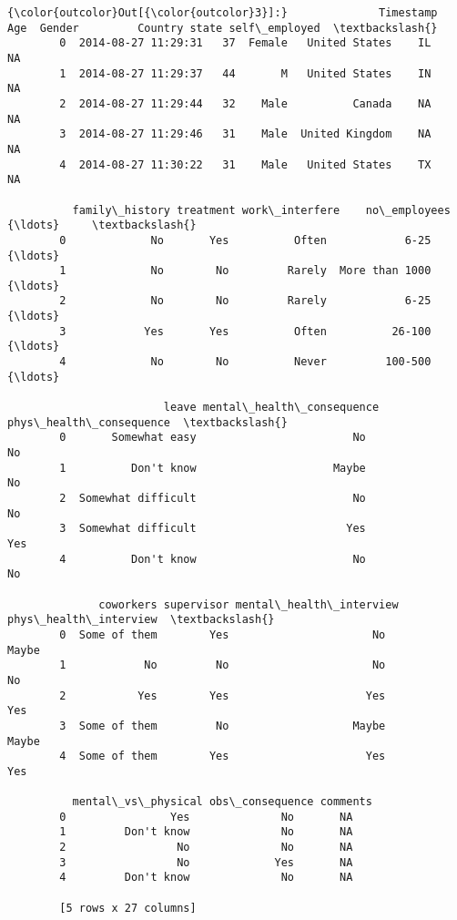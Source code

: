 \documentclass[11pt]{article}
\begin{document}
\begin{Verbatim}[commandchars=\\\{\}]
{\color{outcolor}Out[{\color{outcolor}3}]:}              Timestamp  Age  Gender         Country state self\_employed  \textbackslash{}
        0  2014-08-27 11:29:31   37  Female   United States    IL            NA   
        1  2014-08-27 11:29:37   44       M   United States    IN            NA   
        2  2014-08-27 11:29:44   32    Male          Canada    NA            NA   
        3  2014-08-27 11:29:46   31    Male  United Kingdom    NA            NA   
        4  2014-08-27 11:30:22   31    Male   United States    TX            NA   
        
          family\_history treatment work\_interfere    no\_employees   {\ldots}     \textbackslash{}
        0             No       Yes          Often            6-25   {\ldots}      
        1             No        No         Rarely  More than 1000   {\ldots}      
        2             No        No         Rarely            6-25   {\ldots}      
        3            Yes       Yes          Often          26-100   {\ldots}      
        4             No        No          Never         100-500   {\ldots}      
        
                        leave mental\_health\_consequence phys\_health\_consequence  \textbackslash{}
        0       Somewhat easy                        No                      No   
        1          Don't know                     Maybe                      No   
        2  Somewhat difficult                        No                      No   
        3  Somewhat difficult                       Yes                     Yes   
        4          Don't know                        No                      No   
        
              coworkers supervisor mental\_health\_interview phys\_health\_interview  \textbackslash{}
        0  Some of them        Yes                      No                 Maybe   
        1            No         No                      No                    No   
        2           Yes        Yes                     Yes                   Yes   
        3  Some of them         No                   Maybe                 Maybe   
        4  Some of them        Yes                     Yes                   Yes   
        
          mental\_vs\_physical obs\_consequence comments  
        0                Yes              No       NA  
        1         Don't know              No       NA  
        2                 No              No       NA  
        3                 No             Yes       NA  
        4         Don't know              No       NA  
        
        [5 rows x 27 columns]
\end{Verbatim}
            
\end{document}
